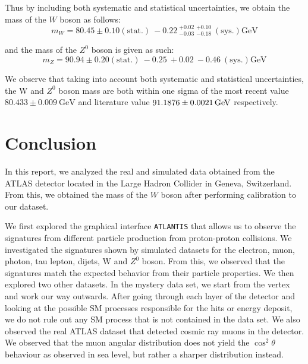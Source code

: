 \documentclass[a4paper]{report}
\numberwithin{equation}{section}
\begin{document}
Thus by including both systematic and statistical uncertainties, we obtain the mass of the $W$ boson as follows:
\begin{equation}
    m_W = 80.45 \pm 0.10 (\mathrm{stat.}) \: -0.22 \: ^{+0.02}_{-0.03} \: ^{+0.10}_{-0.18} \: (\mathrm{sys.}) \si{\giga\electronvolt}
\end{equation}

and the mass of the $Z^0$ boson is given as such: 
\begin{equation}
    m_Z = 90.94 \pm 0.20 (\mathrm{stat.}) \: -0.25 \: + 0.02 \: -0.46 \: (\mathrm{sys.}) \si{\giga\electronvolt}
\end{equation}

We observe that taking into account both systematic and statistical uncertainties, the W and $Z^0$ boson mass are both 
within one sigma of the most recent value $80.433 \pm 0.009 \ \text{GeV}$ and literature value 
$\SI{91.1876 \pm 0.0021}{\giga\electronvolt}$ respectively. 

\chapter{Conclusion}

In this report, we analyzed the real and simulated data obtained from the ATLAS detector located in the Large Hadron 
Collider in Geneva, Switzerland. From this, we obtained the mass of the $W$ boson after performing calibration 
to our dataset. \par 

We first explored the graphical interface \texttt{ATLANTIS} that allows us to observe the signatures from different particle 
production from proton-proton collisions. We investigated the signatures shown by simulated datasets for the 
electron, muon, photon, tau lepton, dijets, W and $Z^0$ boson. From this, we observed that the signatures match the expected 
behavior from their particle properties. We then explored two other datasets. In the mystery data set, we start from the vertex and work our way outwards. After going through each layer of the detector and looking at the possible SM processes responsible for the hits or energy deposit, we do not rule out any SM process that is not contained in the data set. 
We also observed the real ATLAS dataset that detected cosmic ray muons in the detector. We observed that the muon angular
distribution does not yield the $\cos^2 \theta$ behaviour as observed in sea level, but rather a sharper distribution instead. \par
\end{document}
